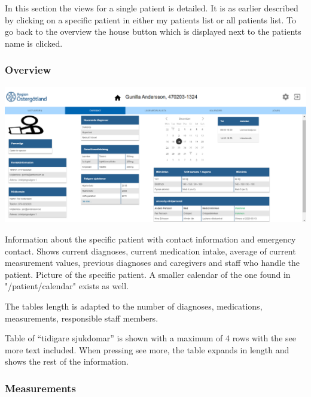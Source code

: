 In this section the views for a single patient is detailed. It is as earlier described by clicking on a specific patient in either my patients list or all patients list. To go back to the overview the house button which is displayed next to the patients name is clicked. 

\subsubsection{Overview}
\begin{center}
    \includegraphics[width=\linewidth]{images/single_patient_overview_image.png}
    \label{fig:figures}
\end{center}
Information about the specific patient with contact information and emergency contact. Shows current diagnoses, current medication intake, average of current measurement values, previous diagnoses and caregivers and staff who handle the patient. Picture of the specific patient. A smaller calendar of the one found in "/patient/calendar" exists as well.

The tables length is adapted to the number of diagnoses, medications, measurements, responsible staff members. 

Table of “tidigare sjukdomar” is shown with a maximum of 4 rows with the see more text included. When pressing see more, the table expands in length and shows the rest of the information.

\subsubsection{Measurements}
    

